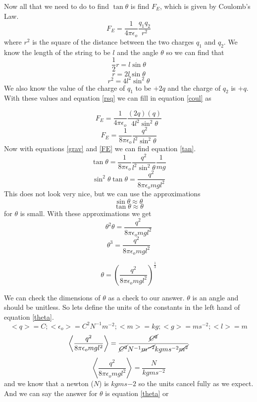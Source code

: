 \documentclass[11pt]{article}
\numberwithin{equation}{section}
\begin{document}
Now all that we need to do to find $\tan{\theta}$ is find $F_E$, which is given by Coulomb's Law.
\begin{equation}
F_E = \frac{1}{4\pi\epsilon_o}\frac{q_1q_2}{r^2}
\label{coul} 
\end{equation} 
where $r^2$ is the square of the distance between the two charges $q_1$ and $q_2$. We know the length of the string to be $l$ and the angle $\theta$ so we can find that 
$$\frac{1}{2}r = l\sin{\theta}$$
$$r = 2l\sin{\theta}$$
\begin{equation}
r^2 = 4l^2\sin^2{\theta}
\label{rsq}
\end{equation}
We also know the value of the charge of $q_1$ to be $+2q$ and the charge of $q_2$ is $+q$. With these values and equation \ref{rsq} we can fill in equation \ref{coul} as

$$F_E = \frac{1}{4\pi\epsilon_o}\frac{(2q)(q)}{4l^2\sin^2{\theta}}$$
\begin{equation}
F_E = \frac{1}{8\pi\epsilon_o}\frac{q^2}{l^2\sin^2{\theta}}
\label{FE}
\end{equation}
Now with equations \ref{grav} and \ref{FE} we can find equation \ref{tan}.
$$\tan{\theta} =\frac{1}{8\pi\epsilon_o}\frac{q^2}{l^2\sin^2{\theta}}\frac{1}{mg}$$ 
$$\sin^2{\theta}\tan{\theta} =\frac{q^2}{8\pi\epsilon_o mg l^2}$$ 
This does not look very nice, but we can use the approximations
$$\sin{\theta} \approx \theta$$
$$\tan{\theta} \approx \theta$$
for $\theta$ is small. With these approximations we get
$$\theta^2\theta =\frac{q^2}{8\pi\epsilon_o mg l^2}$$ 
$$\theta^3 =\frac{q^2}{8\pi\epsilon_o mg l^2}$$ 

\begin{equation}
\theta =\left(\frac{q^2}{8\pi\epsilon_o mg l^2}\right)^{\frac{1}{3}}
\label{theta}
\end{equation}

We can check the dimensions of $\theta$ as a check to our answer. $\theta$ is an angle and should be unitless. So lets define the units of the constants in the left hand of equation \ref{theta}.
$$<q> = C; <\epsilon_o> = C^2N^{-1}m^{-2}; <m> = kg; <g> = m s^{-2}; <l> = m$$
$$\left<\frac{q^2}{8\pi\epsilon_o mg l^2}\right> = \frac{\cancel{C^2}}{\cancel{C^2}N^{-1}\cancel{m^{-2}}kgms^{-2}\cancel{m^2}}$$ 
$$\left<\frac{q^2}{8\pi\epsilon_o mg l^2}\right> = \frac{N}{kgms^{-2}}$$
and we know that a newton ($N$) is $kgms{-2}$ so the units cancel fully as we expect. And we can say the answer for $\theta$ is equation \ref{theta} or
\begin{center}
\end{center}
\end{document}
